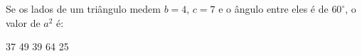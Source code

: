 Se os lados de um triângulo medem $b=4$, $c=7$ e o ângulo entre eles é de $60^\circ$, o valor de $a^2$ é:

\parbox{0.3\linewidth}{

37
49
39
64
25

}


